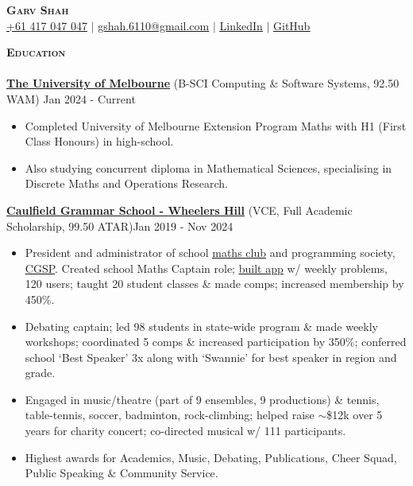 \documentclass[a4paper]{article}
\newcommand{\lineunder} {
    \vspace*{-8pt} \\
    \hspace*{-10pt} \hrulefill \\
}
\newcommand{\header} [1] {
    {\hspace*{-10pt}\vspace*{6pt} \large\textsc{\textbf{#1}}}
    \vspace*{-6pt} \lineunder
}
\begin{document}

\begin{center}
    \textbf{\Huge \scshape Garv Shah} \\ \vspace{1pt}
    \small \href{tel:+61417047047}{+61 417 047 047} $|$ \href{mailto:gshah.6110@gmail.com}{gshah.6110@gmail.com} $|$
    \href{https://www.linkedin.com/in/garvshah/}{\ul{LinkedIn}} $|$
    \href{https://garv-shah.github.io/}{\ul{GitHub}}
\end{center}
\vspace{-2mm}

\header{Education}
\href{https://www.unimelb.edu.au/}{\textbf{\ul{The University of Melbourne}}} (B-SCI Computing \& Software Systems, 92.50 WAM) \hfill Jan 2024 - Current\\
\vspace{-2mm}
\begin{itemize} \itemsep -1pt
    \item Completed University of Melbourne Extension Program Maths with H1 (First Class Honours) in high-school.
    \item Also studying concurrent diploma in Mathematical Sciences, specialising in Discrete Maths and Operations Research.
\end{itemize}
\vspace{-2mm}
\href{https://www.caulfieldgs.vic.edu.au/wheelers-hill/}{\textbf{\ul{Caulfield Grammar School - Wheelers Hill}}} (VCE, Full Academic Scholarship, 99.50 ATAR)\hfill Jan 2019 - Nov 2024\\
\vspace{-2mm}
\begin{itemize} \itemsep -1pt
    \item President and administrator of school \href{https://cgs-math.github.io/}{\ul{maths club}} and programming society, \href{https://cgs-programming.github.io}{\ul{CGSP}}.
    Created school Maths Captain role; \href{https://github.com/cgs-math/app}{\ul{built app}} w/ weekly problems, 120 users; taught 20 student classes \& made comps; increased membership by 450\%.
    \item Debating captain; led 98 students in state-wide program \& made weekly workshops; coordinated 5 comps \& increased participation by 350\%; conferred school ‘Best Speaker’ 3x along with ‘Swannie’ for best speaker in region and grade.
    \item Engaged in music/theatre (part of 9 ensembles, 9 productions) \& tennis, table-tennis, soccer, badminton, rock-climbing; helped raise $\sim$\$12k over 5 years for charity concert; co-directed musical w/ 111 participants.
    \item Highest awards for Academics, Music, Debating, Publications, Cheer Squad, Public Speaking \& Community Service.
\end{itemize}
\vspace{-2mm}
\end{document}
